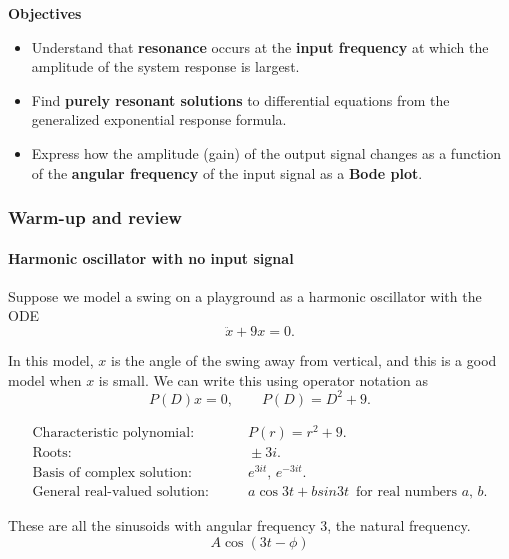 \textbf{Objectives}\\

\begin{itemize}
\item Understand that \textbf{\color{blue}resonance} occurs
  at the \textbf{\color{blue}input frequency} at
  which the amplitude of the system response is largest.
\item Find \textbf{\color{blue}purely resonant solutions}
  to differential equations from the generalized exponential response formula.
\item Express how the amplitude (gain) of the output signal changes
  as a function of the \textbf{\color{blue}angular frequency} of
  the input signal as a \textbf{\color{blue}Bode plot}.  
\end{itemize}
\clearpage
\subsubsection{Warm-up and review}

\paragraph{Harmonic oscillator with no input signal}
Suppose we model a swing on a playground
as a harmonic oscillator with the ODE
\begin{equation*}
  \ddot{x} + 9 x = 0.
\end{equation*}

In this model, $x$ is the angle of the swing away from vertical,
and this is a good model when $x$ is small. We can write this using operator notation as
\begin{equation*}
  P(D)x = 0, \qquad P(D) = D^2 + 9. 
\end{equation*}

\begin{align*}
  \text{Characteristic polynomial:} &\qquad P(r) = r^2 + 9. \\
  \text{Roots:} &\qquad \pm 3i.\\
  \text{Basis of complex solution:}  &\qquad e^{3it},\, e^{-3it}. \\
  \text{General real-valued solution:} &\qquad a \cos 3t + b sin 3t\, \text{ for real numbers } a,\, b.
\end{align*}

These are all the sinusoids with angular frequency $3$, the natural frequency.
\begin{equation*}
  A \cos (3t - \phi)
\end{equation*}
  
